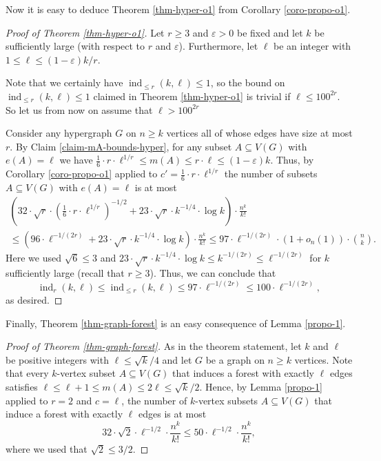 Now it is easy to deduce Theorem \ref{thm-hyper-o1} from Corollary \ref{coro-propo-o1}.

\begin{proof}[Proof of Theorem  \ref{thm-hyper-o1}]Let $r\geq 3$ and $\varepsilon>0$ be fixed and let $k$ be sufficiently large (with respect to $r$ and $\varepsilon$). Furthermore, let $\ell$ be an integer with $1 \leq \ell\leq (1-\varepsilon)k/r$. 

Note that we certainly have $\operatorname{ind}_{\leq r}(k,\ell)\leq 1$, so the bound on $\operatorname{ind}_{\leq r}(k,\ell)\leq 1$ claimed in Theorem  \ref{thm-hyper-o1} is trivial if $\ell\leq 100^{2r}$. So let us from now on assume that $\ell> 100^{2r}$

Consider any hypergraph $G$ on $n\geq k$ vertices all of whose edges have size at most $r$. By Claim \ref{claim-mA-bounds-hyper}, for any subset $A\subseteq V(G)$ with $e(A)=\ell$ we have $\frac{1}{6}\cdot r\cdot \ell^{1/r}\leq m(A)\leq r\cdot \ell\leq  (1-\varepsilon)k$. Thus, by Corollary \ref{coro-propo-o1} applied to $c'=\frac{1}{6}\cdot r\cdot \ell^{1/r}$ the number of subsets $A\subseteq V(G)$ with $e(A)=\ell$ is at most
\begin{multline*}\left(32\cdot \sqrt{r}\cdot \left(\frac{1}{6}\cdot r\cdot \ell^{1/r}\right)^{-1/2}+23 \cdot \sqrt{r}\cdot k^{-1/4}\cdot \log k\right)\cdot \frac{n^k}{k!}\\
\leq \left(96\cdot \ell^{-1/(2r)}+23\cdot \sqrt{r} \cdot k^{-1/4}\cdot \log k\right)\cdot \frac{n^k}{k!}
\leq 97\cdot \ell^{-1/(2r)}\cdot (1+o_n(1))\cdot {n\choose k}.
\end{multline*}
Here we used $\sqrt{6}\leq 3$ and $23\cdot \sqrt{r} \cdot k^{-1/4}\cdot \log k\leq k^{-1/(2r)}\leq \ell^{-1/(2r)}$ for $k$ sufficiently large (recall that $r\geq 3$). Thus, we can conclude that
\[\operatorname{ind}_{r}(k,\ell)\leq \operatorname{ind}_{\leq r}(k,\ell)\leq 97\cdot \ell^{-1/(2r)}\leq 100\cdot \ell^{-1/(2r)},\]
as desired.
\end{proof}

Finally, Theorem \ref{thm-graph-forest} is an easy consequence of Lemma \ref{propo-1}.

\begin{proof}[Proof of Theorem \ref{thm-graph-forest}]As in the theorem statement, let $k$ and $\ell$ be positive integers with $\ell\leq \sqrt{k}/4$ and let $G$ be a graph on $n \geq k$ vertices. Note that every $k$-vertex subset $A\subseteq V(G)$ that induces a forest with exactly $\ell$ edges satisfies $\ell\leq \ell+1\leq m(A)\leq 2\ell\leq \sqrt{k}/2$. Hence, by Lemma \ref{propo-1} applied to $r=2$ and $c=\ell$, the number of $k$-vertex subsets $A\subseteq V(G)$ that induce a forest with exactly $\ell$ edges is at most
\[32\cdot \sqrt{2}\cdot \ell^{-1/2}\cdot \frac{n^k}{k!}\leq 50\cdot \ell^{-1/2}\cdot \frac{n^k}{k!},\]
where we used that $\sqrt{2}\leq 3/2$.\end{proof}


